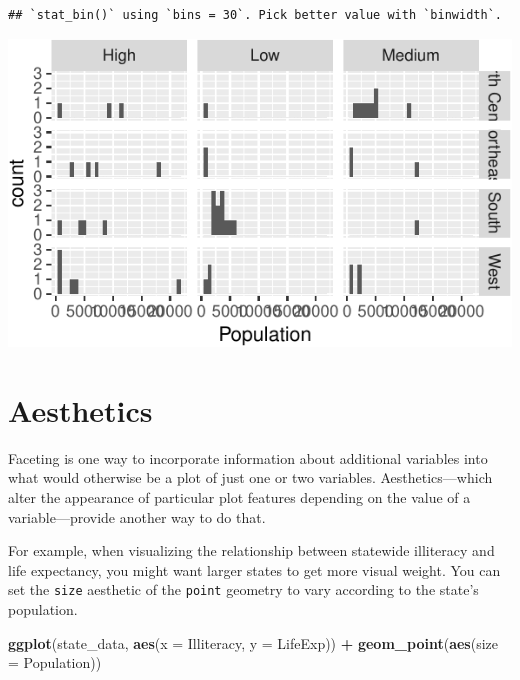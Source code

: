 \documentclass[
  12pt,
  oneside,openany]{book}
\newenvironment{Shaded}{\begin{snugshade}}{\end{snugshade}}
\newcommand{\DataTypeTok}[1]{\textcolor[rgb]{0.13,0.29,0.53}{#1}}
\newcommand{\KeywordTok}[1]{\textcolor[rgb]{0.13,0.29,0.53}{\textbf{#1}}}
\newcommand{\NormalTok}[1]{#1}
\newcommand{\OperatorTok}[1]{\textcolor[rgb]{0.81,0.36,0.00}{\textbf{#1}}}
\newcommand{\StringTok}[1]{\textcolor[rgb]{0.31,0.60,0.02}{#1}}
\begin{document}
\begin{verbatim}
## `stat_bin()` using `bins = 30`. Pick better value with `binwidth`.
\end{verbatim}

\includegraphics{pdaps_files/figure-latex/facet-grid-1.pdf}

\hypertarget{aesthetics}{%
\section{Aesthetics}\label{aesthetics}}

Faceting is one way to incorporate information about additional variables into what would otherwise be a plot of just one or two variables. Aesthetics---which alter the appearance of particular plot features depending on the value of a variable---provide another way to do that.

For example, when visualizing the relationship between statewide illiteracy and life expectancy, you might want larger states to get more visual weight. You can set the \texttt{size} aesthetic of the \texttt{point} geometry to vary according to the state's population.

\begin{Shaded}
\begin{Highlighting}[]
\KeywordTok{ggplot}\NormalTok{(state\_data, }\KeywordTok{aes}\NormalTok{(}\DataTypeTok{x =}\NormalTok{ Illiteracy, }\DataTypeTok{y =}\NormalTok{ LifeExp)) }\OperatorTok{+}
\StringTok{  }\KeywordTok{geom\_point}\NormalTok{(}\KeywordTok{aes}\NormalTok{(}\DataTypeTok{size =}\NormalTok{ Population))}
\end{Highlighting}
\end{Shaded}
\end{document}
